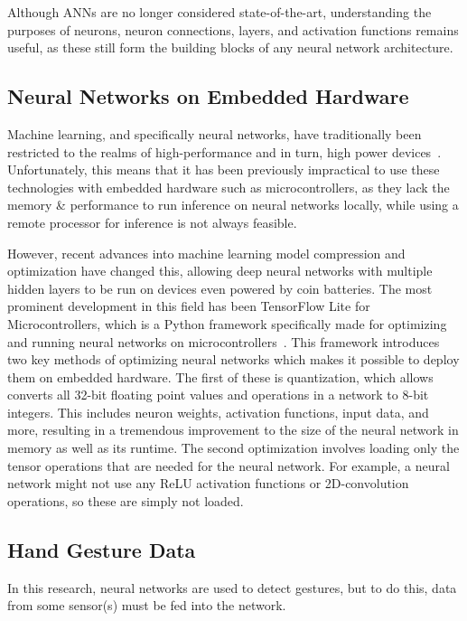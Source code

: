Although ANNs are no longer considered state-of-the-art, understanding the purposes of neurons, neuron connections, layers, and activation functions remains useful, as these still form the building blocks of any neural network architecture.

\subsection{Neural Networks on Embedded Hardware}\label{subsec:machine-learning-on-microcontrollers}
Machine learning, and specifically neural networks, have traditionally been restricted to the realms of high-performance and in turn, high power devices~\cite{8342164}.
Unfortunately, this means that it has been previously impractical to use these technologies with embedded hardware such as microcontrollers, as they lack the memory \& performance to run inference on neural networks locally, while using a remote processor for inference is not always feasible.

However, recent advances into machine learning model compression and optimization have changed this, allowing deep neural networks with multiple hidden layers to be run on devices even powered by coin batteries.
The most prominent development in this field has been TensorFlow Lite for Microcontrollers, which is a Python framework specifically made for optimizing and running neural networks on microcontrollers~\cite{MLSYS2021_d2ddea18}.
This framework introduces two key methods of optimizing neural networks which makes it possible to deploy them on embedded hardware.
The first of these is quantization, which allows converts all 32-bit floating point values and operations in a network to 8-bit integers.
This includes neuron weights, activation functions, input data, and more, resulting in a tremendous improvement to the size of the neural network in memory as well as its runtime.
The second optimization involves loading only the tensor operations that are needed for the neural network.
For example, a neural network might not use any ReLU activation functions or 2D-convolution operations, so these are simply not loaded.

\subsection{Hand Gesture Data}\label{subsec:hand-gesture-data}
In this research, neural networks are used to detect gestures, but to do this, data from some sensor(s) must be fed into the network.

